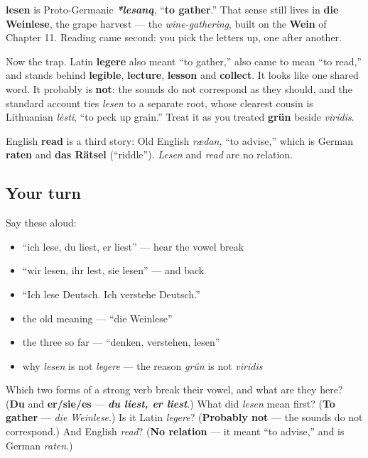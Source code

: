 \begin{cousinweb}
\textbf{lesen} is Proto-Germanic \emph{\textbf{*lesaną}}, \textquotedblleft{}\textbf{to gather}.\textquotedblright{} That sense still lives in \textbf{die Weinlese}, the grape harvest — the \emph{wine-gathering}, built on the \textbf{Wein} of Chapter 11. Reading came second: you pick the letters up, one after another.

Now the trap. Latin \textbf{legere} also meant \textquotedblleft{}to gather,\textquotedblright{} also came to mean \textquotedblleft{}to read,\textquotedblright{} and stands behind \textbf{legible}, \textbf{lecture}, \textbf{lesson} and \textbf{collect}. It looks like one shared word. It probably is \textbf{not}: the sounds do not correspond as they should, and the standard account ties \emph{lesen} to a separate root, whose clearest cousin is Lithuanian \emph{lèsti}, \textquotedblleft{}to peck up grain.\textquotedblright{} Treat it as you treated \textbf{grün} beside \emph{viridis}.

English \textbf{read} is a third story: Old English \emph{rædan}, \textquotedblleft{}to advise,\textquotedblright{} which is German \textbf{raten} and \textbf{das Rätsel} (\textquotedblleft{}riddle\textquotedblright{}). \emph{Lesen} and \emph{read} are no relation.
\end{cousinweb}

\subsection*{Your turn}
Say these aloud:

\begin{itemize}
\raggedright
  \item \textquotedblleft{}ich lese, du liest, er liest\textquotedblright{} — hear the vowel break
  \item \textquotedblleft{}wir lesen, ihr lest, sie lesen\textquotedblright{} — and back
  \item \textquotedblleft{}Ich lese Deutsch. Ich verstehe Deutsch.\textquotedblright{}
  \item the old meaning — \textquotedblleft{}die Weinlese\textquotedblright{}
  \item the three so far — \textquotedblleft{}denken, verstehen, lesen\textquotedblright{}
  \item why \emph{lesen} is not \emph{legere} — the reason \emph{grün} is not \emph{viridis}
\end{itemize}

\begin{tcolorbox}[breakable,colback=teal!4,colframe=teal!35!black,title={Before you move on}]
Which two forms of a strong verb break their vowel, and what are they here? (\textbf{Du} and \textbf{er/sie/es} — \emph{\textbf{du liest, er liest}}.) What did \emph{lesen} mean first? (\textbf{To gather} — \emph{die Weinlese}.) Is it Latin \emph{legere}? (\textbf{Probably not} — the sounds do not correspond.) And English \emph{read}? (\textbf{No relation} — it meant \textquotedblleft{}to advise,\textquotedblright{} and is German \emph{raten}.)
\end{tcolorbox}
